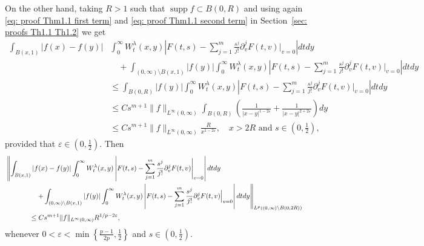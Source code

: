 \documentclass[a4paper,10pt, reqno]{amsart}
\theoremstyle{definition}
\theoremstyle{remark}
\newcommand{\supp}{\mathop{\mathrm{supp}}}
\numberwithin{equation}{section}
\begin{document}
On the other hand, taking $R>1$ such that $\supp f\subset B(0,R)$ and using again \eqref{eq: proof Thm1.1 first term} and \eqref{eq: proof Thm1.1 second term} in Section~\ref{sec: proofs Th1.1 Th1.2} we get
\begin{align*}
    \int_{B(x,1)}|f(x)-f(y)|&\int_0^\infty W_t^\lambda (x,y)\left|F(t,s)-\sum_{j=1}^m\frac{s^j}{j!}\partial_v^jF(t,v)\Bigg|_{v=0}\right|dtdy\\
     &\quad +\int_{(0,\infty)\setminus B(x,1)}|f(y)|\int_0^\infty W_t^\lambda (x,y)\left|F(t,s)-\sum_{j=1}^m\frac{s^j}{j!}\partial_v^jF(t,v)\Bigg|_{v=0}\right|dtdy\\
     &\leq \int_{B(0,R)}|f(y)|\int_0^\infty W_t^\lambda (x,y)\left|F(t,s)-\sum_{j=1}^m\frac{s^j}{j!}\partial_v^jF(t,v)\Bigg|_{v=0}\right|dtdy\\
    &\leq Cs^{m+1}\|f\|_{L^\infty (0,\infty)}\int_{B(0,R)}\left(\frac{1}{|x-y|^{1-2\varepsilon}}+\frac{1}{|x-y|^{2+2\varepsilon }}\right)dy\\
    &\leq Cs^{m+1}\|f\|_{L^\infty (0,\infty)}\frac{R}{x^{1-2\varepsilon}},\quad x>2R\mbox{ and }s\in (0,\tfrac12),
\end{align*}
provided that $\varepsilon \in (0,\tfrac12)$.
Then
\begin{align}\label{G}
&\left\|\int_{B(x,1)}|f(x)-f(y)|\int_0^\infty W_t^\lambda (x,y)\left|F(t,s)-\sum_{j=1}^m\frac{s^j}{j!}\partial_v^jF(t,v)\Bigg|_{v=0}\right|dtdy\right.&\nonumber\\
     &\hspace{1.2cm}\quad \left.+\int_{(0,\infty)\setminus B(x,1)}|f(y)|\int_0^\infty W_t^\lambda (x,y)\left|F(t,s)-\sum_{j=1}^m\frac{s^j}{j!}\partial_v^jF(t,v)\Big|_{v=0}\right|dtdy\right\|_{L^p((0,\infty)\setminus B(0,2R))}\nonumber\\
      &\hspace{1.2cm}\leq Cs^{m+1}\|f\|_{L^\infty (0,\infty)}R^{1/p-2\varepsilon},
\end{align}
whenever $0<\varepsilon<\min\left\{\tfrac{p-1}{2p},\tfrac{1}{2}\right\}$ and $s\in (0,\tfrac12)$.
\end{document}
